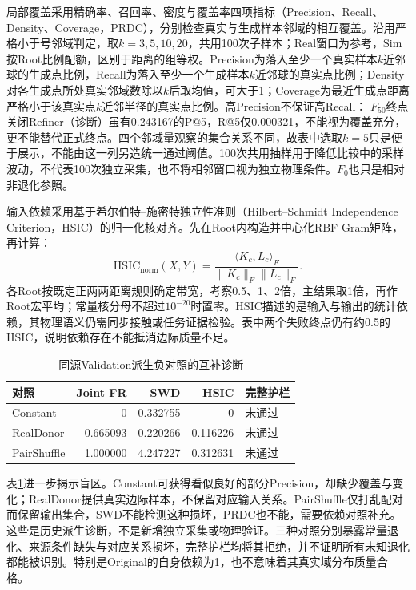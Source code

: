 局部覆盖采用精确率、召回率、密度与覆盖率四项指标（Precision、Recall、Density、Coverage，PRDC），分别检查真实与生成样本邻域的相互覆盖。沿用严格小于号邻域判定，取$k=3,5,10,20$，共用100次子样本；Real窗口为参考，Sim按Root比例配额，区别于距离的组等权。Precision为落入至少一个真实样本$k$近邻球的生成点比例，Recall为落入至少一个生成样本$k$近邻球的真实点比例；Density对各生成点所处真实邻域数除以$k$后取均值，可大于1；Coverage为最近生成点距离严格小于该真实点$k$近邻半径的真实点比例。高Precision不保证高Recall： $F_{50}$终点关闭Refiner（诊断）虽有0.243167的P@5，R@5仅0.000321，不能视为覆盖充分，更不能替代正式终点。四个邻域量观察的集合关系不同，故表中选取$k=5$只是便于展示，不能由这一列另造统一通过阈值。100次共用抽样用于降低比较中的采样波动，不代表100次独立采集，也不将相邻窗口视为独立物理条件。$F_0$也只是相对非退化参照。

输入依赖采用基于希尔伯特--施密特独立性准则（Hilbert--Schmidt Independence Criterion，HSIC）的归一化核对齐。先在Root内构造并中心化RBF Gram矩阵，再计算：
\begin{equation}
 \mathrm{HSIC}_{\mathrm{norm}}(X,Y)=
 \frac{\langle K_c,L_c\rangle_F}{\|K_c\|_F\|L_c\|_F}.
 \label{eq:ch06_normalized_hsic}
\end{equation}
各Root按既定正两两距离规则确定带宽，考察0.5、1、2倍，主结果取1倍，再作Root宏平均；常量核分母不超过$10^{-20}$时置零。HSIC描述的是输入与输出的统计依赖，其物理语义仍需同步接触或任务证据检验。表中两个失败终点仍有约0.5的HSIC，说明依赖存在不能抵消边际质量不足。

\begin{table}[htbp]
\centering
\caption{同源Validation派生负对照的互补诊断}
\label{tab:ch06_quality_negative_controls}
\begin{tabular}{lrrrl}
\toprule
对照 & Joint FR & SWD & HSIC & 完整护栏\\
\midrule
Constant & 0 & 0.332755 & 0 & 未通过\\
RealDonor & 0.665093 & 0.220266 & 0.116226 & 未通过\\
PairShuffle & 1.000000 & 4.247227 & 0.312631 & 未通过\\
\bottomrule
\end{tabular}
\end{table}

表\ref{tab:ch06_quality_negative_controls}进一步揭示盲区。Constant可获得看似良好的部分Precision，却缺少覆盖与变化；RealDonor提供真实边际样本，不保留对应输入关系。PairShuffle仅打乱配对而保留输出集合，SWD不能检测这种损坏，PRDC也不能，需要依赖对照补充。这些是历史派生诊断，不是新增独立采集或物理验证。三种对照分别暴露常量退化、来源条件缺失与对应关系损坏，完整护栏均将其拒绝，并不证明所有未知退化都能被识别。特别是Original的自身依赖为1，也不意味着其真实域分布质量合格。

